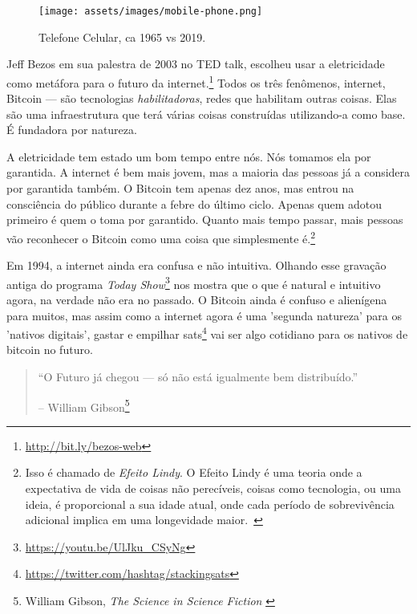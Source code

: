 \begin{figure}
  \texttt{[image: assets/images/mobile-phone.png]}
  \caption{Telefone Celular, ca 1965 vs 2019.}
  \label{fig:mobile-phone}
\end{figure}

Jeff Bezos em sua palestra de 2003 no TED talk, escolheu usar a eletricidade 
como metáfora para o futuro da internet.\footnote{\url{http://bit.ly/bezos-web}} 
Todos os três fenômenos, internet, Bitcoin --- são tecnologias \textit{habilitadoras}, 
redes que habilitam outras coisas. Elas são uma infraestrutura que terá várias coisas construídas utilizando-a como base. É fundadora por natureza.

A eletricidade tem estado um bom tempo entre nós. Nós tomamos ela por garantida.
A internet é bem mais jovem, mas a maioria das pessoas já a considera por 
garantida também. O Bitcoin tem apenas dez anos, mas entrou na consciência 
do público durante a febre do último ciclo. Apenas quem adotou primeiro é 
quem o toma por garantido. Quanto mais tempo passar, mais pessoas vão reconhecer 
o Bitcoin como uma coisa que simplesmente é.\footnote{Isso é chamado de
  \textit{Efeito Lindy}. O Efeito Lindy é uma teoria onde a expectativa 
  de vida de coisas não perecíveis, coisas como tecnologia, ou uma ideia, 
  é proporcional a sua idade atual, onde cada período de sobrevivência adicional 
  implica em uma longevidade maior.~\cite{wiki:lindy}}

Em 1994, a internet ainda era confusa e não intuitiva. Olhando esse gravação antiga
do programa  \textit{Today Show}\footnote{\url{https://youtu.be/UlJku_CSyNg}} nos mostra que o que é 
natural e intuitivo agora, na verdade não era no passado. O Bitcoin ainda é confuso e alienígena 
para muitos, mas assim como a internet agora é uma 'segunda natureza' para os 'nativos digitais', 
gastar e empilhar sats\footnote{\url{https://twitter.com/hashtag/stackingsats}} vai ser algo 
cotidiano para os nativos de bitcoin no futuro.

\begin{quotation}\begin{samepage}
\enquote{O Futuro já chegou --- só não está igualmente bem distribuído.}
\begin{flushright} -- William Gibson\footnote{William Gibson, \textit{The Science in Science Fiction} \cite{william-gibson}}
\end{flushright}\end{samepage}\end{quotation}

